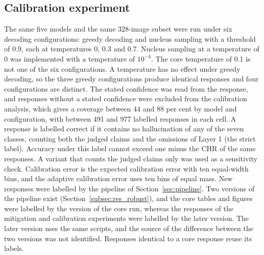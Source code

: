 \documentclass[11pt,a4paper]{article}
\newcommand{\CHR}{\ensuremath{\mathrm{CHR}}}
\begin{document}
\subsection{Calibration experiment}\label{sec:setup_calibration}
The same five models and the same 328-image subset were run under six decoding configurations: greedy decoding and nucleus sampling with a threshold of 0.9, each at temperatures 0, 0.3 and 0.7. Nucleus sampling at a temperature of 0 was implemented with a temperature of $10^{-4}$. The core temperature of 0.1 is not one of the six configurations. A temperature has no effect under greedy decoding, so the three greedy configurations produce identical responses and four configurations are distinct. The stated confidence was read from the response, and responses without a stated confidence were excluded from the calibration analysis, which gives a coverage between 44 and 88 per cent by model and configuration, with between 491 and 977 labelled responses in each cell. A response is labelled correct if it contains no hallucination of any of the seven classes, counting both the judged claims and the omissions of Layer 1 (the strict label). Accuracy under this label cannot exceed one minus the \CHR{} of the same responses. A variant that counts the judged claims only was used as a sensitivity check. Calibration error is the expected calibration error with ten equal-width bins, and the adaptive calibration error uses ten bins of equal mass. New responses were labelled by the pipeline of Section~\ref{sec:pipeline}. Two versions of the pipeline exist (Section~\ref{subsec:res_robust}), and the core tables and figures were labelled by the version of the core run, whereas the responses of the mitigation and calibration experiments were labelled by the later version. The later version uses the same scripts, and the source of the difference between the two versions was not identified. Responses identical to a core response reuse its labels.
\end{document}
